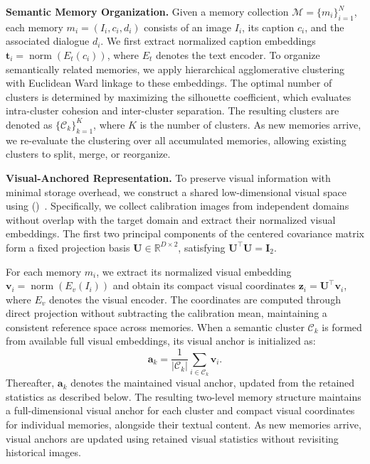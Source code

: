 \noindent \textbf{Semantic Memory Organization.}
Given a memory collection $\mathcal{M}=\{m_i\}_{i=1}^{N}$, each memory $m_i=(I_i,c_i,d_i)$ consists of an image $I_i$, its caption $c_i$, and the associated dialogue $d_i$.
We first extract normalized caption embeddings $\mathbf{t}_i=\operatorname{norm}(E_t(c_i))$, where $E_t$ denotes the text encoder.
To organize semantically related memories, we apply hierarchical agglomerative clustering with Euclidean Ward linkage to these embeddings.
The optimal number of clusters is determined by maximizing the silhouette coefficient, which evaluates intra-cluster cohesion and inter-cluster separation.
The resulting clusters are denoted as $\{\mathcal{C}_k\}_{k=1}^{K}$, where $K$ is the number of clusters.
As new memories arrive, we re-evaluate the clustering over all accumulated memories, allowing existing clusters to split, merge, or reorganize.

\noindent \textbf{Visual-Anchored Representation.}
To preserve visual information with minimal storage overhead, we construct a shared low-dimensional visual space using \pca{} (\pcaabbrv{})~\cite{PCA_RSTA16}.
Specifically, we collect calibration images from independent domains without overlap with the target domain and extract their normalized visual embeddings.
The first two principal components of the centered covariance matrix form a fixed projection basis $\mathbf{U}\in\mathbb{R}^{D\times 2}$, satisfying $\mathbf{U}^{\top}\mathbf{U}=\mathbf{I}_2$.

For each memory $m_i$, we extract its normalized visual embedding $\mathbf{v}_i=\operatorname{norm}(E_v(I_i))$ and obtain its compact visual coordinates $\mathbf{z}_i=\mathbf{U}^{\top}\mathbf{v}_i$, where $E_v$ denotes the visual encoder.
The coordinates are computed through direct projection without subtracting the calibration mean, maintaining a consistent reference space across memories.
When a semantic cluster $\mathcal{C}_k$ is formed from available full visual embeddings, its visual anchor is initialized as:
\begin{equation}
    \mathbf{a}_k = \frac{1}{|\mathcal{C}_k|}
    \sum_{i\in\mathcal{C}_k}\mathbf{v}_i.
\end{equation}
Thereafter, $\mathbf{a}_k$ denotes the maintained visual anchor, updated from the retained statistics as described below.
The resulting two-level memory structure maintains a full-dimensional visual anchor for each cluster and compact visual coordinates for individual memories, alongside their textual content. As new memories arrive, visual anchors are updated using retained visual statistics without revisiting historical images.





